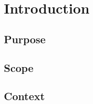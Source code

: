 \chapter{Introduction}\label{chp:introduction}

\section{Purpose} \label{s:introduction:purpose}
	\begin{comment}
	$<$Identify the product whose software requirements are specified in this 
	document, including the revision or release number. Describe the scope of the 
	product that is covered by this SRS, particularly if this SRS describes only 
	part of the system or a single subsystem.$>$
	\end{comment}
	
\section{Scope} \label{s:introduction:scope}
	\begin{comment}
		This standard describes software designs and establishes the information content and organization of a
		software design description (SDD). An SDD is a representation of a software design to be used for
		recording design information and communicating that design information to key design stakeholders. This
		standard is intended for use in design situations in which an explicit SDD is to be prepared. These
		situations include traditional software construction activities, when design leads to code, and “reverse
		engineering” situations when a design description is recovered from an existing implementation.
		This standard can be applied to commercial, scientific, or military software that runs on digital computers.
		Applicability is not restricted by the size, complexity, or criticality of the software. This standard can be
		applied to the description of high-level and detailed designs.
		This standard does not prescribe specific methodologies for design, configuration management, or quality
		assurance. This standard does not require the use of any particular design languages, but establishes
		requirements on the selection of design languages for use in an SDD. This standard can be applied to the
		preparation of SDDs captured as paper documents, automated databases, software development tools, or
		other media.
	\end{comment}

\section{Context} \label{s:introduction:context}
	\begin{comment}
		Context of the document.
	\end{comment}
	
